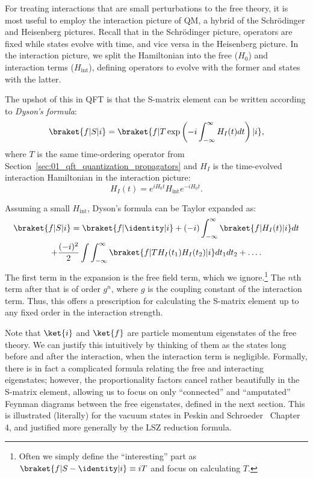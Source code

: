 For treating interactions that are small perturbations to the free theory, it is most useful to employ the interaction picture of QM, a hybrid of the Schr\"odinger and Heisenberg pictures.
Recall that in the Schr\"odinger picture, operators are fixed while states evolve with time, and vice versa in the Heisenberg picture.
In the interaction picture, we split the Hamiltonian into the free ($H_0$) and interaction terms ($H_{\mathrm{int}}$), defining operators to evolve with the former and states with the latter.

The upshot of this in QFT is that the S-matrix element can be written according to \textit{Dyson's formula}:
\begin{equation}
	\label{eq:01_qft_interactions_dysons_formula}
	\braket{f|S|i} = \braket{f|T\exp\left(-i\int_{-\infty}^\infty H_I(t)dt\right)|i},
\end{equation}
where $T$ is the same time-ordering operator from Section~\ref{sec:01_qft_quantization_propagators} and $H_I$ is the time-evolved interaction Hamiltonian in the interaction picture:
\begin{equation}
	\label{eq:01_qft_interactions_interaction_hamiltonian}
	H_I(t) = e^{iH_0t}H_{\mathrm{int}}e^{-iH_0t}.
\end{equation}

Assuming a small $H_{\mathrm{int}}$, Dyson's formula can be Taylor expanded as:
\begin{multline}
	\label{eq:01_qft_interactions_dysons_expansion}
	\braket{f|S|i} = \braket{f|\identity|i} + (-i) \int_{-\infty}^\infty \braket{f|H_I(t)|i}dt \\
	+ \frac{(-i)^2}{2} \int\int_{-\infty}^{\infty} \braket{f|T H_I(t_1)H_I(t_2)|i}dt_1dt_2 + \ldots.
\end{multline}
The first term in the expansion is the free field term, which we ignore.\footnote{Often we simply define the ``interesting'' part as $\braket{f|S-\identity|i} \equiv iT$ and focus on calculating $T$.}
The $n$th term after that is of order $g^n$, where $g$ is the coupling constant of the interaction term.
Thus, this offers a prescription for calculating the S-matrix element up to any fixed order in the interaction strength.

Note that $\ket{i}$ and $\ket{f}$ are particle momentum eigenstates of the free theory.
We can justify this intuitively by thinking of them as the states long before and after the interaction, when the interaction term is negligible.
Formally, there is in fact a complicated formula relating the free and interacting eigenstates; however, the proportionality factors cancel rather beautifully in the S-matrix element, allowing us to focus on only ``connected'' and ``amputated'' Feynman diagrams between the free eigenstates, defined in the next section.
This is illustrated (literally) for the vacuum states in Peskin and Schroeder~\cite{Peskin:1995ev} Chapter 4, and justified more generally by the LSZ reduction formula.


